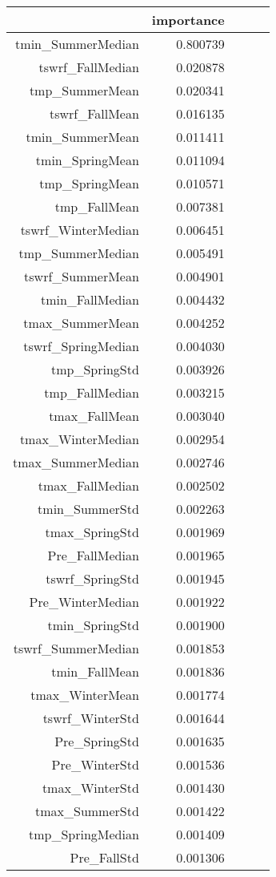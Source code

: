 \begin{tabular}{rrrrr}
\toprule
 & importance \\
\midrule
tmin_SummerMedian & 0.800739 \\
tswrf_FallMedian & 0.020878 \\
tmp_SummerMean & 0.020341 \\
tswrf_FallMean & 0.016135 \\
tmin_SummerMean & 0.011411 \\
tmin_SpringMean & 0.011094 \\
tmp_SpringMean & 0.010571 \\
tmp_FallMean & 0.007381 \\
tswrf_WinterMedian & 0.006451 \\
tmp_SummerMedian & 0.005491 \\
tswrf_SummerMean & 0.004901 \\
tmin_FallMedian & 0.004432 \\
tmax_SummerMean & 0.004252 \\
tswrf_SpringMedian & 0.004030 \\
tmp_SpringStd & 0.003926 \\
tmp_FallMedian & 0.003215 \\
tmax_FallMean & 0.003040 \\
tmax_WinterMedian & 0.002954 \\
tmax_SummerMedian & 0.002746 \\
tmax_FallMedian & 0.002502 \\
tmin_SummerStd & 0.002263 \\
tmax_SpringStd & 0.001969 \\
Pre_FallMedian & 0.001965 \\
tswrf_SpringStd & 0.001945 \\
Pre_WinterMedian & 0.001922 \\
tmin_SpringStd & 0.001900 \\
tswrf_SummerMedian & 0.001853 \\
tmin_FallMean & 0.001836 \\
tmax_WinterMean & 0.001774 \\
tswrf_WinterStd & 0.001644 \\
Pre_SpringStd & 0.001635 \\
Pre_WinterStd & 0.001536 \\
tmax_WinterStd & 0.001430 \\
tmax_SummerStd & 0.001422 \\
tmp_SpringMedian & 0.001409 \\
Pre_FallStd & 0.001306 \\

\end{tabular}
